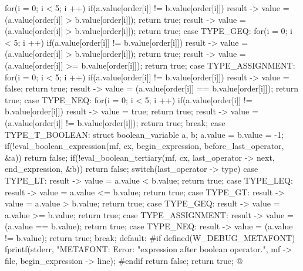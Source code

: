 {{{{{{          for(i = 0; i < 5; i ++)
            if(a.value[order[i]] != b.value[order[i]]){
              result -> value = (a.value[order[i]] > b.value[order[i]]);
              return true;
            }
          result -> value = (a.value[order[i]] > b.value[order[i]]);
          return true;
        case TYPE_GEQ:
          for(i = 0; i < 5; i ++)
            if(a.value[order[i]] != b.value[order[i]]){
              result -> value = (a.value[order[i]] > b.value[order[i]]);
              return true;
            }
          result -> value = (a.value[order[i]] >= b.value[order[i]]);
          return true;
        case TYPE_ASSIGNMENT:
          for(i = 0; i < 5; i ++)
            if(a.value[order[i]] != b.value[order[i]]){
              result -> value = false;
              return true;
            }
          result -> value = (a.value[order[i]] == b.value[order[i]]);
          return true;
        case TYPE_NEQ:
          for(i = 0; i < 5; i ++)
            if(a.value[order[i]] != b.value[order[i]]){
              result -> value = true;
              return true;
            }
          result -> value = (a.value[order[i]] != b.value[order[i]]);
          return true;
      }          
      break;
    }
    case TYPE_T_BOOLEAN:
    {
      struct boolean_variable a, b;
      a.value = b.value = -1;
      if(!eval_boolean_expression(mf, cx, begin_expression,
                                  before_last_operator, &a))
        return false;
      if(!eval_boolean_tertiary(mf, cx, last_operator -> next,
                                end_expression, &b))
        return false;
      switch(last_operator -> type){
      case TYPE_LT:
        result -> value = a.value < b.value;
        return true;
      case TYPE_LEQ:
        result -> value = a.value <= b.value;
        return true;
      case TYPE_GT:
        result -> value = a.value > b.value;
        return true;
      case TYPE_GEQ:
        result -> value = a.value >= b.value;
        return true;
      case TYPE_ASSIGNMENT:
        result -> value = (a.value == b.value);
        return true;
      case TYPE_NEQ:
        result -> value = (a.value != b.value);
        return true;
      }
      break;
    }
    default:
#if defined(W_DEBUG_METAFONT)
      fprintf(stderr, "METAFONT: Error: %
              "expression after boolean operator.\n",  mf -> file,
              begin_expression -> line);
#endif
      return false;
    }
    return true;
  }
}
@
\fimcodigo


}
